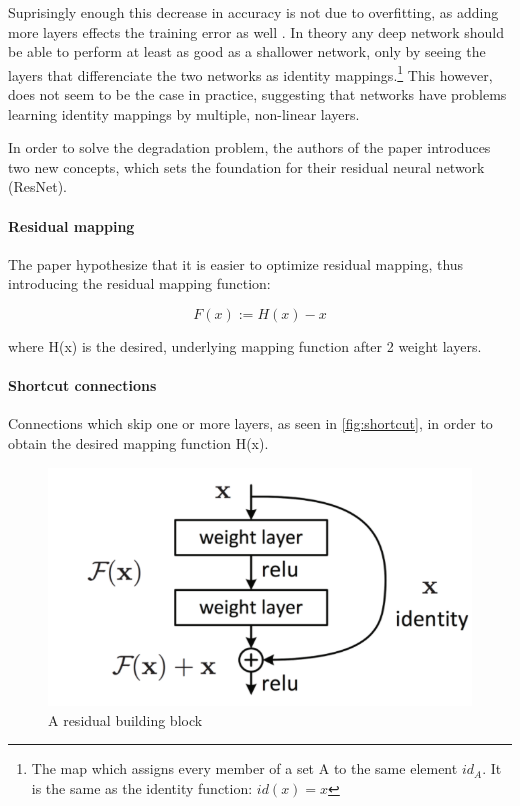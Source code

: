 Suprisingly enough this decrease in accuracy is not due to overfitting, as adding more layers effects the training error as well \citep{Wu2017}. In theory any deep network should be able to perform at least as good as a shallower network, only by seeing the layers that differenciate the two networks as identity mappings.\footnote{The map which assigns every member of a set A to the same element  $id_{A}$. It is the same as the identity function: $id(x)=x$} This however, does not seem to be the case in practice, suggesting that networks have problems learning identity mappings by multiple, non-linear layers.

In order to solve the degradation problem, the authors of the paper introduces two new concepts, which sets the foundation for their residual neural network (ResNet).

\paragraph{Residual mapping}
The paper hypothesize that it is easier to optimize residual mapping, thus introducing the residual mapping function:

\begin{equation}
	F(x) := H(x) - x
\end{equation}

where H(x) is the desired, underlying mapping function after 2 weight layers.

\paragraph{Shortcut connections}
Connections which skip one or more layers, as seen in \autoref{fig:shortcut}, in order to obtain the desired mapping function H(x).

\begin{figure}[!h]
	\centering
	\includegraphics[scale=0.5]{fig/shortcut_connection.png}
	\caption{A residual building block \citep{Wu2017}}
	\label{fig:shortcut}
\end{figure}

